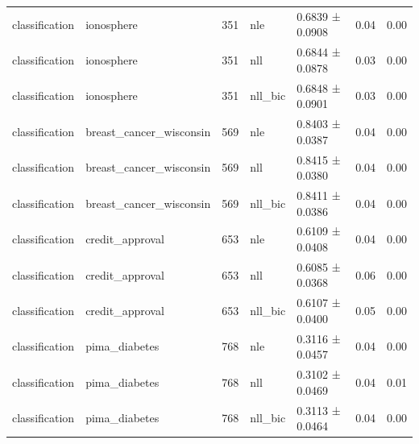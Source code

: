 \begin{table}
{\begin{tabular}{llrllll}
classification & ionosphere & 351 & nle & 0.6839 ± 0.0908 & 0.04 & 0.00 \\
classification & ionosphere & 351 & nll & 0.6844 ± 0.0878 & 0.03 & 0.00 \\
classification & ionosphere & 351 & nll_bic & 0.6848 ± 0.0901 & 0.03 & 0.00 \\
classification & breast_cancer_wisconsin & 569 & nle & 0.8403 ± 0.0387 & 0.04 & 0.00 \\
classification & breast_cancer_wisconsin & 569 & nll & 0.8415 ± 0.0380 & 0.04 & 0.00 \\
classification & breast_cancer_wisconsin & 569 & nll_bic & 0.8411 ± 0.0386 & 0.04 & 0.00 \\
classification & credit_approval & 653 & nle & 0.6109 ± 0.0408 & 0.04 & 0.00 \\
classification & credit_approval & 653 & nll & 0.6085 ± 0.0368 & 0.06 & 0.00 \\
classification & credit_approval & 653 & nll_bic & 0.6107 ± 0.0400 & 0.05 & 0.00 \\
classification & pima_diabetes & 768 & nle & 0.3116 ± 0.0457 & 0.04 & 0.00 \\
classification & pima_diabetes & 768 & nll & 0.3102 ± 0.0469 & 0.04 & 0.01 \\
classification & pima_diabetes & 768 & nll_bic & 0.3113 ± 0.0464 & 0.04 & 0.00 \\
\bottomrule
\end{tabular}
}
\end{table}
